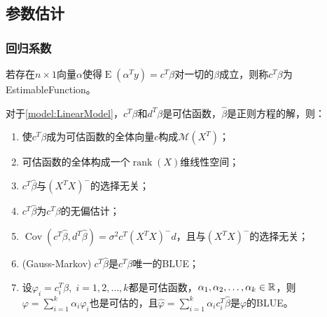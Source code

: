 \subsection{参数估计}
\subsubsection{回归系数}
\begin{definition}
	若存在$n\times 1$向量$\alpha$使得$\operatorname{E}(\alpha^Ty)=c^T\beta$对一切的$\beta$成立，则称$c^T\beta$为\gls{EstimableFunction}。
\end{definition}
\begin{property}\label{prop:EstimableFunction}
	对于\cref{model:LinearModel}，$c^T\beta$和$d^T\beta$是可估函数，$\hat{\beta}$是正则方程的解，则：
	\begin{enumerate}
		\item 使$c^T\beta$成为可估函数的全体向量$c$构成$\mathcal{M}(X^T)$；
		\item 可估函数的全体构成一个$\operatorname{rank}(X)$维线性空间；
		\item $c^T\hat{\beta}$与$(X^TX)^-$的选择无关；
		\item $c^T\hat{\beta}$为$c^T\beta$的无偏估计；
		\item  $\operatorname{Cov}(c^T\hat{\beta},d^T\hat{\beta})=\sigma^2c^T(X^TX)^-d$，且与$(X^TX)^-$的选择无关；
		\item (Gauss-Markov)$\;c^T\hat{\beta}$是$c^T\beta$唯一的BLUE；
		\item 设$\varphi_i=c_i^T\beta,\;i=1,2,\dots,k$都是可估函数，$\alpha_1, \alpha_2, \dots, \alpha_{k}\in\mathbb{R}^{}$，则$\varphi=\sum\limits_{i=1}^{k}\alpha_i\varphi_i$也是可估的，且$\hat{\varphi}=\sum\limits_{i=1}^{k}\alpha_ic_i^T\hat{\beta}$是$\varphi$的BLUE。
	\end{enumerate}
\end{property}
